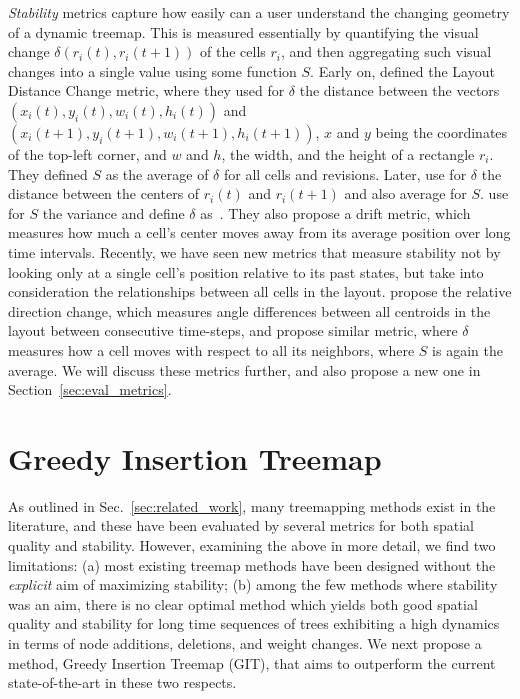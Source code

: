 \noindent\emph{Stability} metrics capture how easily can a user understand the changing geometry of a dynamic treemap. This is measured essentially by quantifying the visual change $\delta(r_i(t), r_i(t+1))$ of the cells $r_i$, and then aggregating such visual changes into a single value using some function $S$. Early on, \cite{ordered} defined the Layout Distance Change metric, where they used for $\delta$ the distance between the vectors $(x_i(t), y_i(t), w_i(t), h_i(t))$ and $(x_i(t+1), y_i(t+1), w_i(t+1), h_i(t+1))$, $x$ and $y$ being the coordinates of the top-left corner, and $w$ and $h$, the width, and the height of a rectangle $r_i$. They defined $S$ as the average of $\delta$ for all cells and revisions. Later, \cite{hahn10} use for $\delta$ the distance between the centers of $r_i(t)$ and $r_i(t+1)$ and also average for $S$. \cite{hilbert_moore} use for $S$ the variance and define $\delta$ as~\citep{ordered}. They also propose a drift metric, which measures how much a cell's center moves away from its average position over long time intervals. Recently, we have seen new metrics that measure stability not by looking only at a single cell's position relative to its past states, but take into consideration the relationships between all cells in the layout. \cite{Hahn2017} propose the relative direction change, which measures angle differences between all centroids in the layout between consecutive time-steps, and \cite{sondag17} propose similar metric, where $\delta$ measures how a cell moves with respect to all its neighbors, where $S$ is again the average.
We will discuss these metrics further, and also propose a new one in Section~\ref{sec:eval_metrics}.

\section{Greedy Insertion Treemap}
\label{sec:git}
%
As outlined in Sec.~\ref{sec:related_work}, many treemapping methods exist in the literature, and these have been evaluated by several metrics for both spatial quality and stability. However, examining the above in more detail, we find two limitations: (a) most existing treemap methods have been designed without the \emph{explicit} aim of maximizing stability; (b) among the few methods where stability was an aim, there is no clear optimal method which yields both good spatial quality and stability for long time sequences of trees exhibiting a high dynamics in terms of node additions, deletions, and weight changes. We next propose a method, Greedy Insertion Treemap (GIT), that aims to outperform the current state-of-the-art in these two respects.


